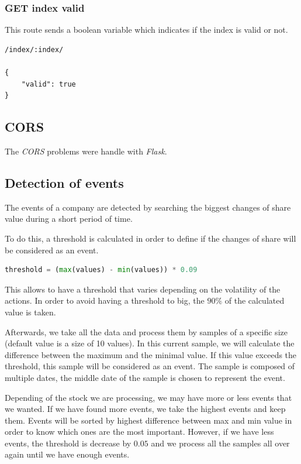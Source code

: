 \subsubsection*{GET index valid}
This route sends a boolean variable which indicates if the index is valid or not.
\begin{verbatim}
/index/:index/

{
    "valid": true
}
\end{verbatim}
\subsection{CORS}

The \textit{CORS} problems were handle with \textit{Flask}.

\subsection{Detection of events}

The events of a company are detected by searching the biggest changes of share value during a short period of time.

To do this, a threshold is calculated in order to define if the changes of share will be considered as an event.

\begin{lstlisting}[language=python, belowskip=-1.0 \baselineskip]
    threshold = (max(values) - min(values)) * 0.09
\end{lstlisting}

This allows to have a threshold that varies depending on the volatility of the actions. In order to avoid having a threshold to big, the $90\%$ of the calculated value is taken.

Afterwards, we take all the data and process them by samples of a specific size (default value is a size of 10 values). In this current sample, we will calculate the difference between the maximum and the minimal value. If this value exceeds the threshold, this sample will be considered as an event. The sample is composed of multiple dates, the middle date of the sample is chosen to represent the event.

Depending of the stock we are processing, we may have more or less events that we wanted. If we have found more events, we take the highest events and keep them. Events will be sorted by highest difference between max and min value in order to know which ones are the most important. However, if we have less events, the threshold is decrease by $0.05$ and we process all the samples all over again until we have enough events.






